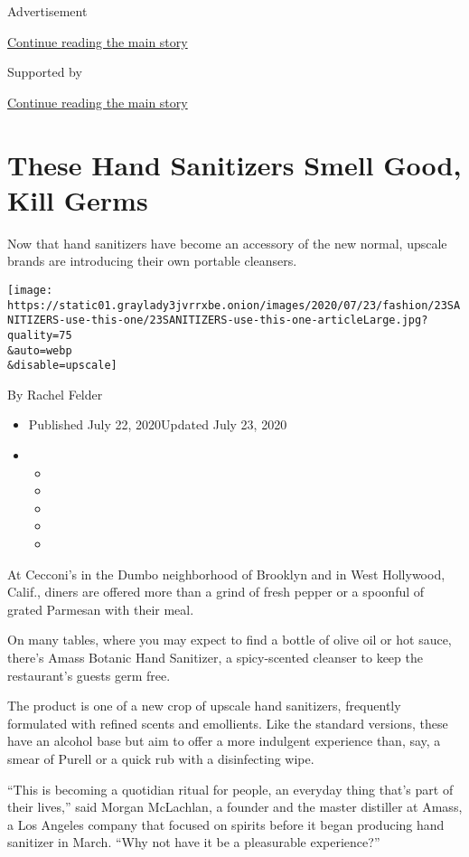 Advertisement

\protect\hyperlink{after-top}{Continue reading the main story}

Supported by

\protect\hyperlink{after-sponsor}{Continue reading the main story}

\hypertarget{these-hand-sanitizers-smell-good-kill-germs}{%
\section{These Hand Sanitizers Smell Good, Kill
Germs}\label{these-hand-sanitizers-smell-good-kill-germs}}

Now that hand sanitizers have become an accessory of the new normal,
upscale brands are introducing their own portable cleansers.

\texttt{[image: https://static01.graylady3jvrrxbe.onion/images/2020/07/23/fashion/23SANITIZERS-use-this-one/23SANITIZERS-use-this-one-articleLarge.jpg?quality=75\\\&auto=webp\\\&disable=upscale]}

By Rachel Felder

\begin{itemize}
\item
  Published July 22, 2020Updated July 23, 2020
\item
  \begin{itemize}
  \item
  \item
  \item
  \item
  \item
  \end{itemize}
\end{itemize}

At Cecconi's in the Dumbo neighborhood of Brooklyn and in West
Hollywood, Calif., diners are offered more than a grind of fresh pepper
or a spoonful of grated Parmesan with their meal.

On many tables, where you may expect to find a bottle of olive oil or
hot sauce, there's Amass Botanic Hand Sanitizer, a spicy-scented
cleanser to keep the restaurant's guests germ free.

The product is one of a new crop of upscale hand sanitizers, frequently
formulated with refined scents and emollients. Like the standard
versions, these have an alcohol base but aim to offer a more indulgent
experience than, say, a smear of Purell or a quick rub with a
disinfecting wipe.

``This is becoming a quotidian ritual for people, an everyday thing
that's part of their lives,'' said Morgan McLachlan, a founder and the
master distiller at Amass, a Los Angeles company that focused on spirits
before it began producing hand sanitizer in March. ``Why not have it be
a pleasurable experience?''


